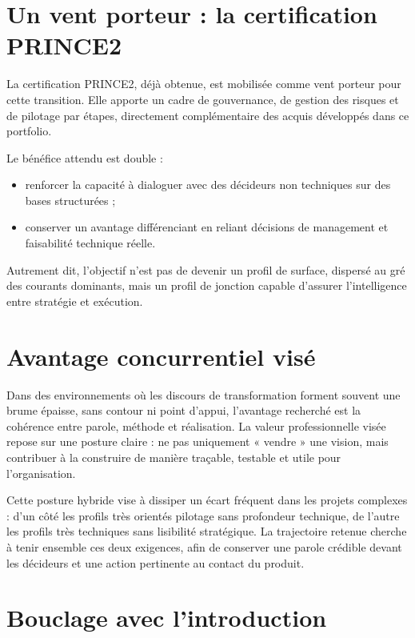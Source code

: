 \section{Un vent porteur : la certification PRINCE2}

La certification PRINCE2, déjà obtenue, est mobilisée comme vent porteur pour cette transition. Elle apporte un cadre de gouvernance, de gestion des risques et de pilotage par étapes, directement complémentaire des acquis développés dans ce portfolio.

Le bénéfice attendu est double :
\begin{itemize}
  \item renforcer la capacité à dialoguer avec des décideurs non techniques sur des bases structurées ;
  \item conserver un avantage différenciant en reliant décisions de management et faisabilité technique réelle.
\end{itemize}

Autrement dit, l'objectif n'est pas de devenir un profil de surface, dispersé au gré des courants dominants, mais un profil de jonction capable d'assurer l'intelligence entre stratégie et exécution.

\section{Avantage concurrentiel visé}

Dans des environnements où les discours de transformation forment souvent une brume épaisse, sans contour ni point d'appui, l'avantage recherché est la cohérence entre parole, méthode et réalisation. La valeur professionnelle visée repose sur une posture claire : ne pas uniquement « vendre » une vision, mais contribuer à la construire de manière traçable, testable et utile pour l'organisation.

Cette posture hybride vise à dissiper un écart fréquent dans les projets complexes : d'un côté les profils très orientés pilotage sans profondeur technique, de l'autre les profils très techniques sans lisibilité stratégique. La trajectoire retenue cherche à tenir ensemble ces deux exigences, afin de conserver une parole crédible devant les décideurs et une action pertinente au contact du produit.

\section{Bouclage avec l'introduction}

